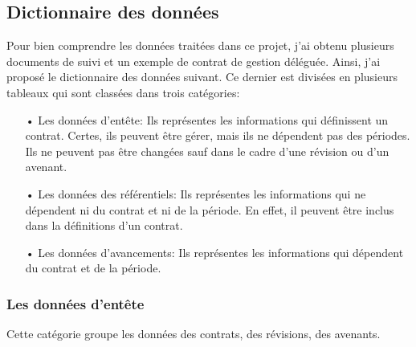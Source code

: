 \documentclass[a4paper]{report}
\begin{document}
\begin{doublespace}
	\subsection{Dictionnaire des données}
	Pour bien comprendre les données traitées dans ce projet, j'ai obtenu plusieurs documents de suivi et un exemple de contrat de gestion déléguée. Ainsi, j'ai proposé le dictionnaire des données suivant. Ce dernier est divisées en plusieurs tableaux qui sont classées dans trois catégories:
    \begin{itemize}
	\item[•] Les données d'entête: Ils représentes les informations qui définissent un contrat. Certes, ils peuvent être gérer, mais ils ne dépendent pas des périodes. Ils ne peuvent pas être changées sauf dans le cadre d'une révision ou d'un avenant.
	\item[•] Les données des référentiels: Ils représentes les informations qui ne dépendent ni du contrat et ni de la période. En effet, il peuvent être inclus dans la définitions d'un contrat.
	\item[•] Les données d'avancements: Ils représentes les informations qui dépendent du contrat et de la période.
    \end{itemize}
    
    \subsubsection{Les données d'entête}
    
    Cette catégorie groupe les données des contrats, des révisions, des avenants.
    

\end{doublespace}
\end{document}
